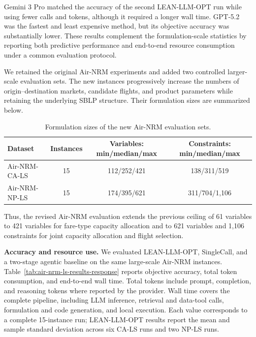 \documentclass[11pt]{article}
\begin{document}
\begin{enumerate}[label=(AssoE.\arabic*),leftmargin=*]
\begin{enumerate}[label=(R2.Major.\arabic*),leftmargin=*]
Gemini 3 Pro matched the accuracy of the second LEAN-LLM-OPT run while using
fewer calls and tokens, although it required a longer wall time. GPT-5.2 was
the fastest and least expensive method, but its objective accuracy was
substantially lower. These results complement the formulation-scale statistics
by reporting both predictive performance and end-to-end resource consumption
under a common evaluation protocol.

We retained the original Air-NRM experiments and added two controlled
larger-scale evaluation sets. The new instances progressively increase the
numbers of origin--destination markets, candidate flights, and product
parameters while retaining the underlying SBLP structure. Their formulation
sizes are summarized below.

\begin{table}[!htbp]
\centering
\caption{Formulation sizes of the new Air-NRM evaluation sets.}
\label{tab:air-nrm-scale-response}
\begin{tabular}{lccc}
\toprule
\textbf{Dataset} & \textbf{Instances}
& \textbf{Variables: min/median/max}
& \textbf{Constraints: min/median/max} \\
\midrule
Air-NRM-CA-LS & 15 & 112/252/421 & 138/311/519 \\
Air-NRM-NP-LS & 15 & 174/395/621 & 311/704/1,106 \\
\bottomrule
\end{tabular}
\end{table}

Thus, the revised Air-NRM evaluation extends the previous ceiling of 61
variables to 421 variables for fare-type capacity allocation and to 621
variables and 1,106 constraints for joint capacity allocation and flight
selection.

\medskip
\noindent\textbf{Accuracy and resource use.}
We evaluated LEAN-LLM-OPT, SingleCall, and a two-stage agentic baseline on
the same large-scale Air-NRM instances. Table~\ref{tab:air-nrm-ls-results-response}
reports objective accuracy, total token consumption, and end-to-end wall time.
Total tokens include prompt, completion, and reasoning tokens where reported
by the provider. Wall time covers the complete pipeline, including LLM
inference, retrieval and data-tool calls, formulation and code generation,
and local execution. Each value corresponds to a complete 15-instance run;
LEAN-LLM-OPT results report the mean and sample standard deviation across
six CA-LS runs and two NP-LS runs.


\end{enumerate}
\end{enumerate}
\end{document}
